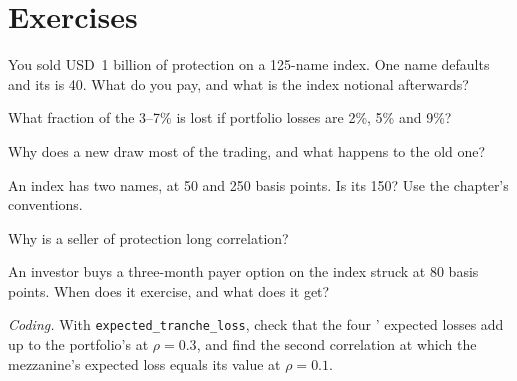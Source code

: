 \section{Exercises}

\begin{exercise}[$\star$]\label{exo:m2:credit-indices-and-tranches:1}
You sold USD~1 billion of protection on a 125-name index. One name defaults and its
 is 40. What do you pay, and what is the index notional afterwards?
\end{exercise}

\begin{exercise}[$\star$]\label{exo:m2:credit-indices-and-tranches:2}
What fraction of the 3--7\%  is lost if portfolio losses are 2\%, 5\% and 9\%?
\end{exercise}

\begin{exercise}[$\star$]\label{exo:m2:credit-indices-and-tranches:3}
Why does a new  draw most of the trading, and what happens to the old one?
\end{exercise}

\begin{exercise}[$\star\star$]\label{exo:m2:credit-indices-and-tranches:4}
An index has two names, at 50 and 250 basis points. Is its  150? Use
the chapter's conventions.
\end{exercise}

\begin{exercise}[$\star\star$]\label{exo:m2:credit-indices-and-tranches:5}
Why is a seller of  protection long correlation?
\end{exercise}

\begin{exercise}[$\star\star$]\label{exo:m2:credit-indices-and-tranches:6}
An investor buys a three-month payer option on the index struck at 80 basis points.
When does it exercise, and what does it get?
\end{exercise}

\begin{exercise}[$\star\star\star$]\label{exo:m2:credit-indices-and-tranches:7}
\emph{Coding.} With \texttt{expected\_tranche\_loss}, check that the four '
expected losses add up to the portfolio's at $\rho = 0.3$, and find the second
correlation at which the mezzanine's expected loss equals its value at $\rho = 0.1$.
\end{exercise}

